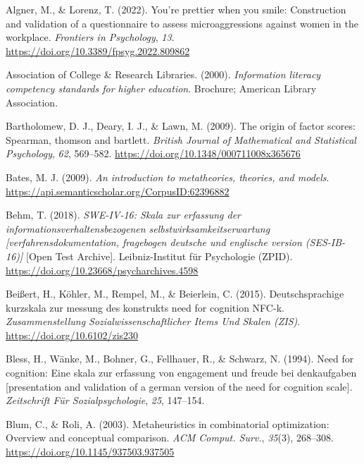 \documentclass[
  12pt,
  a4paper,
  twoside]{article}
\newlength{\cslhangindent}
\newenvironment{CSLReferences}[2] %
 {\begin{list}{}{%
  \setlength{\itemindent}{0pt}
  \setlength{\leftmargin}{0pt}
  \setlength{\parsep}{0pt}
  \ifodd #1
   \setlength{\leftmargin}{\cslhangindent}
   \setlength{\itemindent}{-1\cslhangindent}
  \fi
  \setlength{\itemsep}{#2\baselineskip}}}
 {\end{list}}
\begin{document}
\label{refs}
\begin{CSLReferences}{1}{0}
Algner, M., \& Lorenz, T. (2022). You're prettier when you smile: Construction and validation of a questionnaire to assess microaggressions against women in the workplace. \emph{Frontiers in Psychology}, \emph{13}. \url{https://doi.org/10.3389/fpsyg.2022.809862}

Association of College \& Research Libraries. (2000). \emph{Information literacy competency standards for higher education}. Brochure; American Library Association.

Bartholomew, D. J., Deary, I. J., \& Lawn, M. (2009). The origin of factor scores: Spearman, thomson and bartlett. \emph{British Journal of Mathematical and Statistical Psychology}, \emph{62}, 569--582. \url{https://doi.org/10.1348/000711008x365676}

Bates, M. J. (2009). \emph{An introduction to metatheories, theories, and models}. \url{https://api.semanticscholar.org/CorpusID:62396882}

Behm, T. (2018). \emph{SWE-IV-16: Skala zur erfassung der informationsverhaltensbezogenen selbstwirksamkeitserwartung {[}verfahrensdokumentation, fragebogen deutsche und englische version (SES-IB-16){]}} {[}Open Test Archive{]}. Leibniz-Institut für Psychologie (ZPID). \url{https://doi.org/10.23668/psycharchives.4598}

Beißert, H., Köhler, M., Rempel, M., \& Beierlein, C. (2015). Deutschsprachige kurzskala zur messung des konstrukts need for cognition NFC-k. \emph{Zusammenstellung Sozialwissenschaftlicher Items Und Skalen (ZIS)}. \url{https://doi.org/10.6102/zis230}

Bless, H., Wänke, M., Bohner, G., Fellhauer, R., \& Schwarz, N. (1994). Need for cognition: Eine skala zur erfassung von engagement und freude bei denkaufgaben {[}presentation and validation of a german version of the need for cognition scale{]}. \emph{Zeitschrift Für Sozialpsychologie}, \emph{25}, 147--154.

Blum, C., \& Roli, A. (2003). Metaheuristics in combinatorial optimization: Overview and conceptual comparison. \emph{ACM Comput. Surv.}, \emph{35}(3), 268--308. \url{https://doi.org/10.1145/937503.937505}


\end{CSLReferences}
\end{document}
